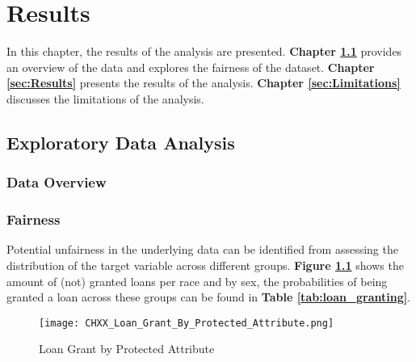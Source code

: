 \chapter{Results}\label{chap:Results}

In this chapter, the results of the analysis are presented. \textbf{Chapter \ref{sec:Exploratory_Data_Analysis}} provides an overview of the data and explores the fairness of the dataset. 
\textbf{Chapter \ref{sec:Results}} presents the results of the analysis. \textbf{Chapter \ref{sec:Limitations}} discusses the limitations of the analysis.

\section{Exploratory Data Analysis}\label{sec:Exploratory_Data_Analysis}



\subsection{Data Overview}\label{subsec:Data_Overview}



\subsection{Fairness}\label{subsec:Fairness}



Potential unfairness in the underlying data can be identified from assessing the distribution of the target variable across different groups.
\textbf{Figure \ref{fig:CHXX_Loan_Grant_By_Protected_Attribute}} shows the amount of (not) granted loans per race and by sex, the probabilities of being granted a loan across these groups can be found in \textbf{Table \ref{tab:loan_granting}}.\@

\begin{figure}[h]
    \centering
    \texttt{[image: CHXX\_Loan\_Grant\_By\_Protected\_Attribute.png]}
    \caption{Loan Grant by Protected Attribute}
    \label{fig:CHXX_Loan_Grant_By_Protected_Attribute}
\end{figure}

